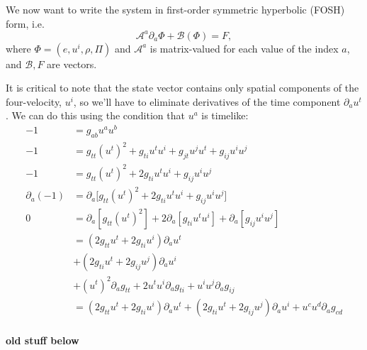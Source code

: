 \documentclass[12pt]{article}
\numberwithin{equation}{section}
\begin{document}
We now want to write the system in first-order symmetric hyperbolic (FOSH) form, i.e.
\begin{equation}
\mathcal{A}^{a} \partial_{a} \Phi + \mathcal{B}(\Phi) = F,
\end{equation}
where $\Phi = (e, u^i, \rho , \Pi)$ and $\mathcal{A}^a$ is matrix-valued for each value of the index $a$, and $\mathcal{B}, F$ are vectors.

It is critical to note that the state vector contains only spatial components of the four-velocity, $u^i$, so we'll have to eliminate derivatives of the time component $\partial_a u^t$.
We can do this using the condition that $u^a$ is timelike:
\begin{equation}
\begin{aligned}
-1 &= g_{ab} u^a u^b \\
-1 &= g_{tt} (u^t)^2 + g_{ti} u^t u^i + g_{jt} u^j u^t + g_{ij} u^i u^j \\
-1 &= g_{tt} (u^t)^2 + 2 g_{ti} u^t u^i + g_{ij} u^i u^j \\
\partial_{a} (-1) &= \partial_{a} \Big[ g_{tt} (u^t)^2 + 2 g_{ti} u^t u^i + g_{ij} u^i u^j \Big] \\
0 &= \partial_{a} [g_{tt} (u^t)^2] + 2 \partial_{a} [g_{ti} u^t u^i] + \partial_{a} [g_{ij} u^i u^j] \\
&= (2 g_{tt} u^t + 2 g_{ti} u^i) \partial_{a} u^t \\
&+ (2 g_{ti} u^t + 2 g_{ij} u^j) \partial_{a} u^i \\
&+ (u^t)^2 \partial_{a} g_{tt} + 2 u^t u^i \partial_{a} g_{ti} + u^i u^j \partial_{a} g_{ij} \\
&= (2 g_{tt} u^t + 2 g_{ti} u^i) \partial_{a} u^t + (2 g_{ti} u^t + 2 g_{ij} u^j) \partial_{a} u^i + u^c u^d \partial_{a} g_{cd} \\
\end{aligned}
\end{equation}

\noindent\textbf{old stuff below}
\end{document}

